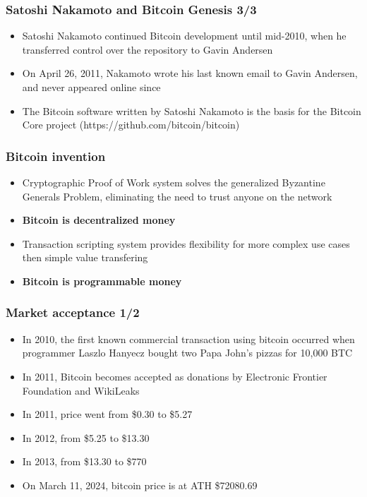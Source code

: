 \documentclass{beamer}
\begin{document}
\begin{frame}
  \frametitle{Satoshi Nakamoto and Bitcoin Genesis 3/3}
  \begin{itemize}
  \item Satoshi Nakamoto continued Bitcoin development until mid-2010, when he
    transferred control over the repository to Gavin Andersen
  \item On April 26, 2011, Nakamoto wrote his last known email to Gavin
    Andersen, and never appeared online since
  \item The Bitcoin software written by Satoshi Nakamoto is the basis for the
    Bitcoin Core project (https://github.com/bitcoin/bitcoin)
  \end{itemize}
\end{frame}

\begin{frame}
  \frametitle{Bitcoin invention}
  \begin{itemize}
  \item Cryptographic Proof of Work system solves the generalized Byzantine
    Generals Problem, eliminating the need to trust anyone on the network
  \item \textbf{Bitcoin is decentralized money}
  \item Transaction scripting system provides flexibility for more complex use
    cases then simple value transfering
  \item \textbf{Bitcoin is programmable money}
  \end{itemize}
\end{frame}

\begin{frame}
  \frametitle{Market acceptance 1/2}
  \begin{itemize}
  \item In 2010, the first known commercial transaction using bitcoin occurred
    when programmer Laszlo Hanyecz bought two Papa John's pizzas for 10,000 BTC
  \item In 2011, Bitcoin becomes accepted as donations by Electronic Frontier
    Foundation and WikiLeaks
  \item In 2011, price went from \$0.30 to \$5.27
  \item In 2012, from \$5.25 to \$13.30
  \item In 2013, from \$13.30 to \$770
  \item On March 11, 2024, bitcoin price is at ATH \$72080.69
  \end{itemize}
\end{frame}
\end{document}
